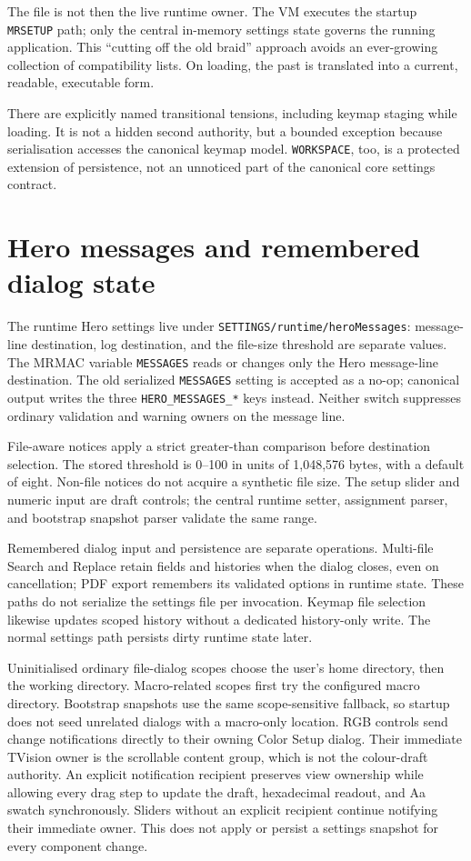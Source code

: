 \documentclass[a4paper,10pt,twoside,openany]{book}
\begin{document}
The file is not then the live runtime owner. The VM executes the startup
\texttt{MRSETUP} path; only the central in-memory settings state governs the
running application. This ``cutting off the old braid'' approach avoids an
ever-growing collection of compatibility lists. On loading, the past is
translated into a current, readable, executable form.

There are explicitly named transitional tensions, including keymap staging
while loading. It is not a hidden second authority, but a bounded exception
because serialisation accesses the canonical keymap model. \texttt{WORKSPACE},
too, is a protected extension of persistence, not an unnoticed part of the
canonical core settings contract.

\section{Hero messages and remembered dialog state}

The runtime Hero settings live under \texttt{SETTINGS/runtime/heroMessages}:
message-line destination, log destination, and the file-size threshold are
separate values. The MRMAC variable \texttt{MESSAGES} reads or changes only the
Hero message-line destination. The old serialized \texttt{MESSAGES} setting
is accepted as a no-op; canonical output writes the three
\texttt{HERO\_MESSAGES\_*} keys instead. Neither switch suppresses ordinary
validation and warning owners on the message line.

File-aware notices apply a strict greater-than comparison before destination
selection. The stored threshold is 0--100 in units of 1,048,576 bytes, with a
default of eight. Non-file notices do not acquire a synthetic file size. The
setup slider and numeric input are draft controls; the central runtime setter,
assignment parser, and bootstrap snapshot parser validate the same range.

Remembered dialog input and persistence are separate operations. Multi-file
Search and Replace retain fields and histories when the dialog closes, even
on cancellation; PDF export remembers its validated options in runtime state.
These paths do not serialize the settings file per invocation. Keymap file
selection likewise updates scoped history without a dedicated history-only
write. The normal settings path persists dirty runtime state later.

Uninitialised ordinary file-dialog scopes choose the user's home directory,
then the working directory. Macro-related scopes first try the configured
macro directory. Bootstrap snapshots use the same scope-sensitive fallback,
so startup does not seed unrelated dialogs with a macro-only location.
RGB controls send change notifications directly to their owning Color Setup
dialog. Their immediate TVision owner is the scrollable content group, which
is not the colour-draft authority. An explicit notification recipient preserves
view ownership while allowing every drag step to update the draft, hexadecimal
readout, and Aa swatch synchronously. Sliders without an explicit recipient
continue notifying their immediate owner. This does not apply or persist a
settings snapshot for every component change.
\end{document}
